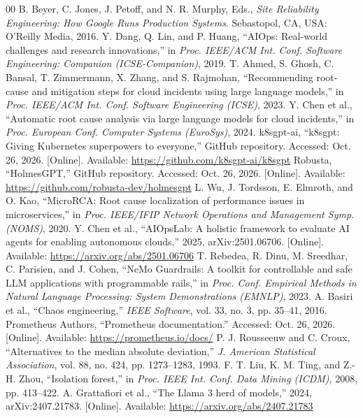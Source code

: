 \documentclass[conference,a4paper]{IEEEtran}
\begin{document}
\begin{thebibliography}{00}
 B. Beyer, C. Jones, J. Petoff, and N. R. Murphy, Eds., \textit{Site Reliability Engineering: How Google Runs Production Systems}. Sebastopol, CA, USA: O'Reilly Media, 2016.
 Y. Dang, Q. Lin, and P. Huang, ``AIOps: Real-world challenges and research innovations,'' in \textit{Proc. IEEE/ACM Int. Conf. Software Engineering: Companion (ICSE-Companion)}, 2019.
 T. Ahmed, S. Ghosh, C. Bansal, T. Zimmermann, X. Zhang, and S. Rajmohan, ``Recommending root-cause and mitigation steps for cloud incidents using large language models,'' in \textit{Proc. IEEE/ACM Int. Conf. Software Engineering (ICSE)}, 2023.
 Y. Chen et al., ``Automatic root cause analysis via large language models for cloud incidents,'' in \textit{Proc. European Conf. Computer Systems (EuroSys)}, 2024.
 k8sgpt-ai, ``k8sgpt: Giving Kubernetes superpowers to everyone,'' GitHub repository. Accessed: Oct. 26, 2026. [Online]. Available: \url{https://github.com/k8sgpt-ai/k8sgpt}
 Robusta, ``HolmesGPT,'' GitHub repository. Accessed: Oct. 26, 2026. [Online]. Available: \url{https://github.com/robusta-dev/holmesgpt}
 L. Wu, J. Tordsson, E. Elmroth, and O. Kao, ``MicroRCA: Root cause localization of performance issues in microservices,'' in \textit{Proc. IEEE/IFIP Network Operations and Management Symp. (NOMS)}, 2020.
 Y. Chen et al., ``AIOpsLab: A holistic framework to evaluate AI agents for enabling autonomous clouds,'' 2025, arXiv:2501.06706. [Online]. Available: \url{https://arxiv.org/abs/2501.06706}
 T. Rebedea, R. Dinu, M. Sreedhar, C. Parisien, and J. Cohen, ``NeMo Guardrails: A toolkit for controllable and safe LLM applications with programmable rails,'' in \textit{Proc. Conf. Empirical Methods in Natural Language Processing: System Demonstrations (EMNLP)}, 2023.
 A. Basiri et al., ``Chaos engineering,'' \textit{IEEE Software}, vol. 33, no. 3, pp. 35--41, 2016.
 Prometheus Authors, ``Prometheus documentation.'' Accessed: Oct. 26, 2026. [Online]. Available: \url{https://prometheus.io/docs/}
 P. J. Rousseeuw and C. Croux, ``Alternatives to the median absolute deviation,'' \textit{J. American Statistical Association}, vol. 88, no. 424, pp. 1273--1283, 1993.
 F. T. Liu, K. M. Ting, and Z.-H. Zhou, ``Isolation forest,'' in \textit{Proc. IEEE Int. Conf. Data Mining (ICDM)}, 2008, pp. 413--422.
 A. Grattafiori et al., ``The Llama 3 herd of models,'' 2024, arXiv:2407.21783. [Online]. Available: \url{https://arxiv.org/abs/2407.21783}
\end{thebibliography}
\end{document}
